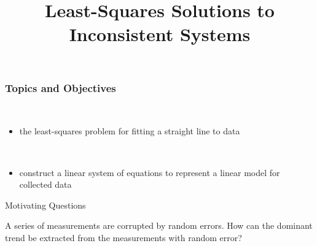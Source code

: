 \title{Least-Squares Solutions to Inconsistent Systems}
\subtitle{\SubTitleName}
\institute[]{\Course}
\author{\Instructor}
\maketitle   

 
\begin{frame}\frametitle{Topics and Objectives}
 \\
\begin{itemize}

    \item the least-squares problem for fitting a straight line to data
    
\end{itemize}

\vspace{0.5cm}

\\

\begin{itemize}

    \item construct a linear system of equations to represent a linear model for collected data
  
\end{itemize}

\vspace{0.25cm} 
 
 \end{frame}

\begin{frame}{Motivating Questions}

    A series of measurements are corrupted by random errors.  How can the dominant trend be extracted from the measurements with random error? 

\end{frame}



